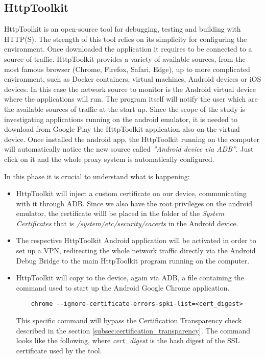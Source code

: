 		\subsection{HttpToolkit}
		\label{sec:http_toolkit}
			\par HttpToolkit\cite{http_toolkit} is an open-source tool for debugging, testing and building with HTTP(S). The strength of this tool relies on its simplicity for configuring the environment. Once downloaded the application it requires to be connected to a source of traffic. HttpToolkit provides a variety of available sources, from the most famous browser (Chrome, Firefox, Safari, Edge), up to more complicated environment, such as Docker containers, virtual machines, Android devices or iOS devices. In this case the network source to monitor is the Android virtual device where the applications will run. The program itself will notify the user which are the available sources of traffic at the start up. Since the scope of the study is investigating applications running on the android emulator, it is needed to download from Google Play the HttpToolkit application also on the virtual device. Once installed the android app, the HttpToolkit running on the computer will automatically notice the new source called \textit{''Android device via ADB''}. Just click on it and the whole proxy system is automatically configured. \newline
			\par In this phase it is crucial to understand what is happening:
			\begin{itemize}
				\item HttpToolkit will inject a custom certificate on our device, communicating with it through ADB. Since we also have the root privileges on the android emulator, the certificate willl be placed in the folder of the \textit{System Certificates} that is \textit{/system/etc/security/cacerts} in the Android device. \newline
				\item The respective HttpToolkit Android application will be activated in order to set up a VPN, redirecting the whole network traffic directly via the Android Debug Bridge to the main HttpToolkit program running on the computer. \newline
				\item HttpToolkit will copy to the device, again via ADB, a file containing the command used to start up the Android Google Chrome application. 
\begin{lstlisting}
	chrome --ignore-certificate-errors-spki-list=<cert_digest>
\end{lstlisting}
This specific command will bypass the Certification Transparency check described in the section \ref{subsec:certification_transparency}. The command looks like the following, where \textit{cert\_digest} is the hash digest of the SSL certificate used by the tool.
			\end{itemize} 
			

